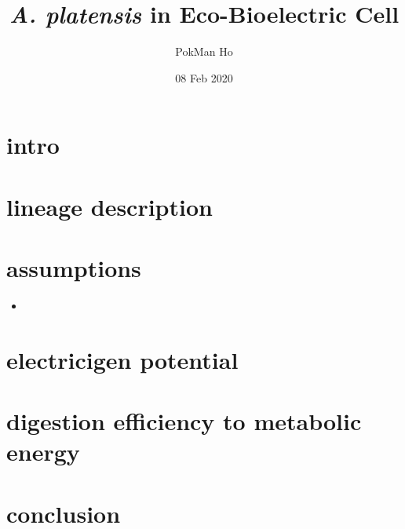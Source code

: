 \documentclass[a4paper,11pt]{article}
\title{\textit{A. platensis} in Eco-Bioelectric Cell}
\author{PokMan Ho}
\date{08 Feb 2020}
\begin{document}
    \maketitle
    \tableofcontents
    \maketitle
    \tableofcontents
    \clearpage
    
    \section{intro}
    
    \section{lineage description}
    
    \section{assumptions}
    \begin{itemize}
        \item 
    \end{itemize}
    
    \section{electricigen potential}
    
    \section{digestion efficiency to metabolic energy}
    
    \section{conclusion}
    
    \nocite{*}\printbibliography
\end{document}

